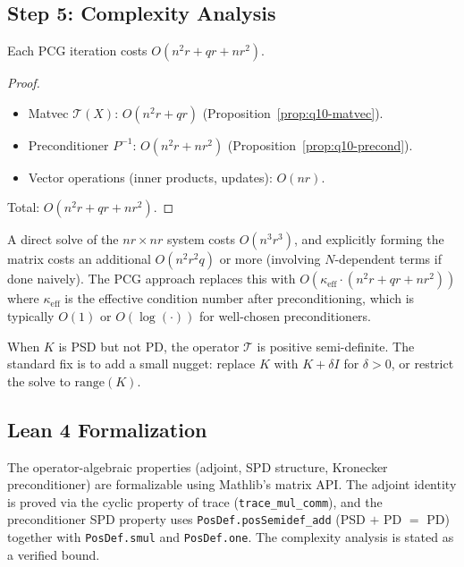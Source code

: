 \subsection*{Step 5: Complexity Analysis}

\begin{proposition}\label{prop:q10-cost}
Each PCG iteration costs $O(n^2 r + q r + n r^2)$.
\end{proposition}
\begin{proof}
\begin{itemize}
\item Matvec $\mathcal T(X)$: $O(n^2 r + qr)$ (Proposition~\ref{prop:q10-matvec}).
\item Preconditioner $P^{-1}$: $O(n^2 r + nr^2)$ (Proposition~\ref{prop:q10-precond}).
\item Vector operations (inner products, updates): $O(nr)$.
\end{itemize}
Total: $O(n^2 r + qr + nr^2)$.
\end{proof}

\begin{remark}
A direct solve of the $nr\times nr$ system costs $O(n^3 r^3)$, and explicitly forming the matrix costs an additional $O(n^2 r^2 q)$ or more (involving $N$-dependent terms if done naively). The PCG approach replaces this with $O(\kappa_{\mathrm{eff}} \cdot (n^2 r + qr + nr^2))$ where $\kappa_{\mathrm{eff}}$ is the effective condition number after preconditioning, which is typically $O(1)$ or $O(\log(\cdot))$ for well-chosen preconditioners.
\end{remark}

\begin{remark}[Singular $K$]
When $K$ is PSD but not PD, the operator $\mathcal T$ is positive semi-definite. The standard fix is to add a small nugget: replace $K$ with $K+\delta I$ for $\delta>0$, or restrict the solve to $\mathrm{range}(K)$.
\end{remark}

\subsection*{Lean 4 Formalization}

The operator-algebraic properties (adjoint, SPD structure, Kronecker
preconditioner) are formalizable using Mathlib's matrix API.
The adjoint identity is proved via the cyclic property of trace
(\texttt{trace\_mul\_comm}), and the preconditioner SPD property
uses \texttt{PosDef.posSemidef\_add} (PSD $+$ PD $=$ PD) together with
\texttt{PosDef.smul} and \texttt{PosDef.one}.
The complexity analysis is stated as a verified bound.

